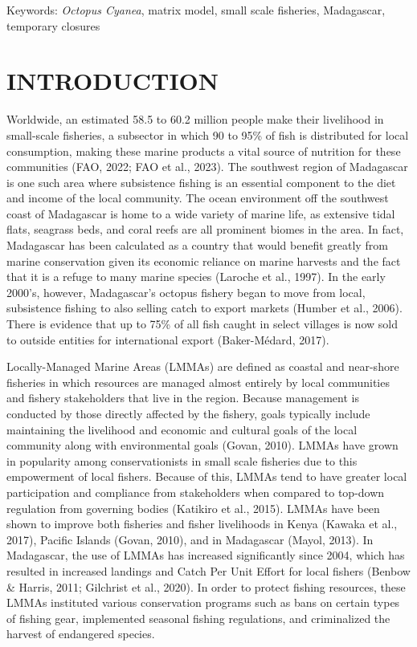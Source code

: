 \documentclass[
]{article}
\begin{document}
Keywords: \emph{Octopus Cyanea}, matrix model, small scale fisheries, Madagascar, temporary closures

\hypertarget{introduction}{%
\section{INTRODUCTION}\label{introduction}}

Worldwide, an estimated 58.5 to 60.2 million people make their livelihood in small-scale fisheries, a subsector in which 90 to 95\% of fish is distributed for local consumption, making these marine products a vital source of nutrition for these communities (FAO, 2022; FAO et al., 2023). The southwest region of Madagascar is one such area where subsistence fishing is an essential component to the diet and income of the local community. The ocean environment off the southwest coast of Madagascar is home to a wide variety of marine life, as extensive tidal flats, seagrass beds, and coral reefs are all prominent biomes in the area. In fact, Madagascar has been calculated as a country that would benefit greatly from marine conservation given its economic reliance on marine harvests and the fact that it is a refuge to many marine species (Laroche et al., 1997). In the early 2000's, however, Madagascar's octopus fishery began to move from local, subsistence fishing to also selling catch to export markets (Humber et al., 2006). There is evidence that up to 75\% of all fish caught in select villages is now sold to outside entities for international export (Baker-Médard, 2017).

Locally-Managed Marine Areas (LMMAs) are defined as coastal and near-shore fisheries in which resources are managed almost entirely by local communities and fishery stakeholders that live in the region. Because management is conducted by those directly affected by the fishery, goals typically include maintaining the livelihood and economic and cultural goals of the local community along with environmental goals (Govan, 2010). LMMAs have grown in popularity among conservationists in small scale fisheries due to this empowerment of local fishers. Because of this, LMMAs tend to have greater local participation and compliance from stakeholders when compared to top-down regulation from governing bodies (Katikiro et al., 2015). LMMAs have been shown to improve both fisheries and fisher livelihoods in Kenya (Kawaka et al., 2017), Pacific Islands (Govan, 2010), and in Madagascar (Mayol, 2013). In Madagascar, the use of LMMAs has increased significantly since 2004, which has resulted in increased landings and Catch Per Unit Effort for local fishers (Benbow \& Harris, 2011; Gilchrist et al., 2020). In order to protect fishing resources, these LMMAs instituted various conservation programs such as bans on certain types of fishing gear, implemented seasonal fishing regulations, and criminalized the harvest of endangered species.
\end{document}
